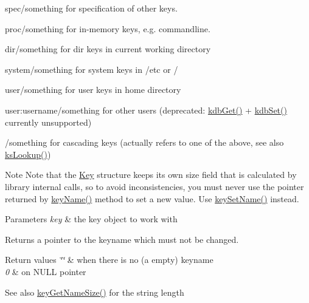 \begin{DoxyItemize}
\item {\ttfamily spec/something} for specification of other keys.
\item {\ttfamily proc/something} for in-\/memory keys, e.\+g. commandline.
\item {\ttfamily dir/something} for dir keys in current working directory
\item {\ttfamily system/something} for system keys in /etc or /
\item {\ttfamily user/something} for user keys in home directory
\item {\ttfamily user\+:username/something} for other users (deprecated\+: \hyperlink{group__kdb_ga28e385fd9cb7ccfe0b2f1ed2f62453a1}{kdb\+Get()} + \hyperlink{group__kdb_ga11436b058408f83d303ca5e996832bcf}{kdb\+Set()} currently unsupported)
\item {\ttfamily /something} for cascading keys (actually refers to one of the above, see also \hyperlink{group__keyset_gaa34fc43a081e6b01e4120daa6c112004}{ks\+Lookup()})

\begin{DoxyNote}{Note}
Note that the \hyperlink{classkdb_1_1Key}{Key} structure keeps its own size field that is calculated by library internal calls, so to avoid inconsistencies, you must never use the pointer returned by \hyperlink{group__keyname_ga8e805c726a60da921d3736cda7813513}{key\+Name()} method to set a new value. Use \hyperlink{group__keyname_ga7699091610e7f3f43d2949514a4b35d9}{key\+Set\+Name()} instead.
\end{DoxyNote}

\begin{DoxyParams}{Parameters}
{\em key} & the key object to work with \\
\hline
\end{DoxyParams}
\begin{DoxyReturn}{Returns}
a pointer to the keyname which must not be changed. 
\end{DoxyReturn}

\begin{DoxyRetVals}{Return values}
{\em \char`\"{}\char`\"{}} & when there is no (a empty) keyname \\
\hline
{\em 0} & on N\+U\+LL pointer \\
\hline
\end{DoxyRetVals}
\begin{DoxySeeAlso}{See also}
\hyperlink{group__keyname_gabdbcfa51ed8a387e47ead207affa2d2e}{key\+Get\+Name\+Size()} for the string length 


\end{DoxySeeAlso}
\end{DoxyItemize}
